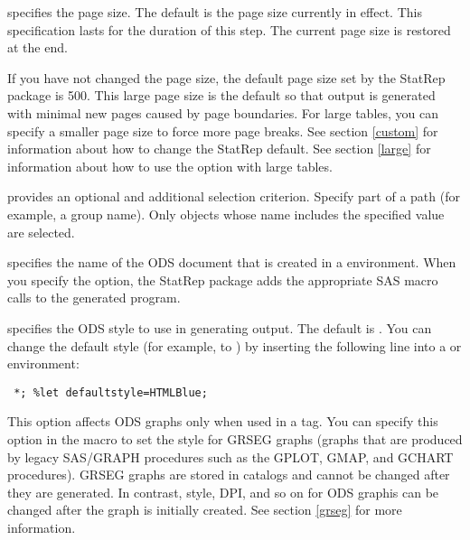 \documentclass[article,oneside]{memoir}
\newcommand*{\StatRep}{\textsf{StatRep}\xspace}
\begin{document}
\begin{description}
\begin{description}
  \end{description}

  \item[\Code{pagesize=}] specifies the page size. The default is the page size currently in effect.
  This specification lasts for the
  duration of this step. The current page size is restored at the end.

  If you have not changed the page size, the default page size set by the \StatRep
  package is 500. This large page size is the default so that output is generated with
  minimal new pages caused by page boundaries. For large tables, you can specify a smaller
  page size to force more page breaks. See section \ref{custom} for information about
  how to change the \StatRep default. See section \ref{large} for information about how
  to use the  option with large tables.

  \item[\Code{pattern=}] provides an optional and additional selection criterion.
  Specify part of a path (for example, a group name).
  Only objects whose name includes the specified value are selected.

    \item[\Code{store=}] specifies the name of the ODS document that is created in a
      environment. When you specify the  option,
     the \StatRep package adds the appropriate SAS macro calls to the
     generated program.

  \item[\Code{style=}] specifies the ODS style to use in generating output.
    The default is \mbox{}. You can change the default style
    (for example, to ) by inserting the following line into a 
    or  environment:

\begin{snugshade}
\begin{verbatim}
 *; %let defaultstyle=HTMLBlue;
\end{verbatim}
\end{snugshade}

    This option affects ODS graphs only when used in a  tag.
    You can specify this option in the  macro to set the style
    for GRSEG graphs (graphs that are produced by legacy SAS/GRAPH
    procedures such as the GPLOT, GMAP, and GCHART procedures).
    GRSEG graphs are stored in catalogs
    and cannot be changed after they are generated. In contrast,
    style, DPI, and so on for ODS graphis can be changed after the graph is initially created.
    See section \ref{grseg} for more information.


\end{description}
\end{document}
